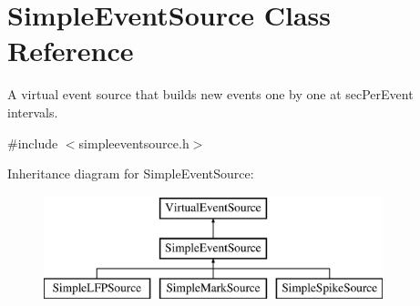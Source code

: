 \hypertarget{class_simple_event_source}{\section{Simple\-Event\-Source Class Reference}
\label{class_simple_event_source}
}


A virtual event source that builds new events one by one at sec\-Per\-Event intervals.  




{\ttfamily \#include $<$simpleeventsource.\-h$>$}

Inheritance diagram for Simple\-Event\-Source\-:\begin{figure}[H]
\begin{center}
\leavevmode
\includegraphics[height=3.000000cm]{class_simple_event_source}
\end{center}
\end{figure}
